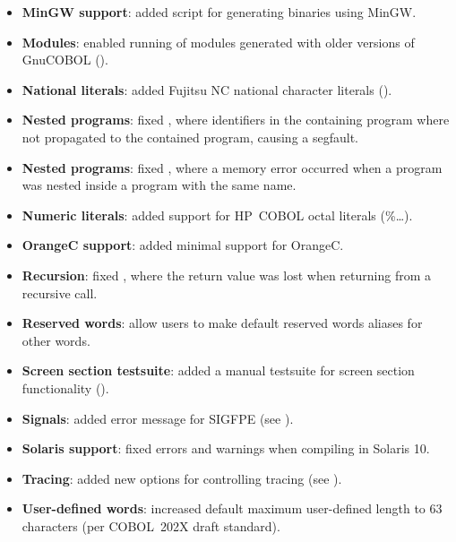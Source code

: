 \begin{itemize}
\item \textbf{MinGW support}: added script for generating binaries using MinGW.
\item \textbf{Modules}: enabled running of modules generated with older versions of GnuCOBOL ().
\item \textbf{National literals}: added Fujitsu NC national character literals ().
\item \textbf{Nested programs}: fixed , where identifiers in the containing program where not propagated to the contained program, causing a segfault.
\item \textbf{Nested programs}: fixed , where a memory error occurred when a program was nested inside a program with the same name.
\item \textbf{Numeric literals}: added support for HP~COBOL octal literals (\%\ldots).
\item \textbf{OrangeC support}: added minimal support for OrangeC.
\item \textbf{Recursion}: fixed , where the return value was lost when returning from a recursive call.
\item \textbf{Reserved words}: allow users to make default reserved words aliases for other words.
\item  \textbf{Screen section testsuite}: added a manual testsuite for screen section functionality ().
\item \textbf{Signals}: added error message for SIGFPE (see ).
\item \textbf{Solaris support}: fixed errors and warnings when compiling in Solaris 10.
\item \textbf{Tracing}: added new options for controlling tracing (see ).
\item \textbf{User-defined words}: increased default maximum user-defined length to 63 characters (per COBOL~202X draft standard).
\end{itemize}

